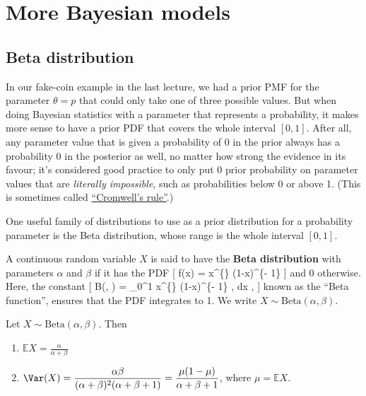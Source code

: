 \documentclass[
  letterpaper,
  DIV=11,
  numbers=noendperiod]{scrreprt}
\providecommand{\tightlist}{%
  \setlength{\itemsep}{0pt}\setlength{\parskip}{0pt}}\usepackage{longtable,booktabs,array}
\theoremstyle{remark}
\begin{document}
\hypertarget{L20-bayes-models}{%
\chapter{More Bayesian models}\label{L20-bayes-models}}

\hypertarget{beta}{%
\section{Beta distribution}\label{beta}}

In our fake-coin example in the last lecture, we had a prior PMF for the
parameter \(\theta = p\) that could only take one of three possible
values. But when doing Bayesian statistics with a parameter that
represents a probability, it makes more sense to have a prior PDF that
covers the whole interval \([0,1]\). After all, any parameter value that
is given a probability of 0 in the prior always has a probability 0 in
the posterior as well, no matter how strong the evidence in its favour;
it's considered good practice to only put 0 prior probability on
parameter values that are \emph{literally impossible}, such as
probabilities below 0 or above 1. (This is sometimes called
\href{https://en.wikipedia.org/wiki/Cromwell\%27s_rule}{``Cromwell's
rule''}.)

One useful family of distributions to use as a prior distribution for a
probability parameter is the Beta distribution, whose range is the whole
interval \([0,1]\).

A continuous random variable \(X\) is said to have the \textbf{Beta
distribution} with parameters \(\alpha\) and \(\beta\) if it has the PDF
{[} f(x) =  x\^{}\{\}
(1-x)\^{}\{\beta - 1\} \qquad {} {]} and 0
otherwise. Here, the constant {[} B(\alpha, \beta) = \int\_0\^{}1
x\^{}\{\} (1-x)\^{}\{\beta - 1\} , \mathrm dx , {]} known as the
``Beta function'', ensures that the PDF integrates to 1. We write
\(X \sim \text{Beta}(\alpha, \beta)\).

Let \(X \sim \text{Beta}(\alpha,\beta)\). Then

\begin{enumerate}
\def\labelenumi{\arabic{enumi}.}
\tightlist
\item
  \(\mathbb EX = \displaystyle\frac{\alpha}{\alpha + \beta}\)
\item
  \(\Var(X) = \displaystyle\frac{\alpha\beta}{(\alpha+\beta)^2(\alpha+\beta+1)} = \displaystyle\frac{\mu(1-\mu)}{\alpha+\beta + 1}\),
  where \(\mu = \mathbb EX\).
\end{enumerate}
\end{document}

